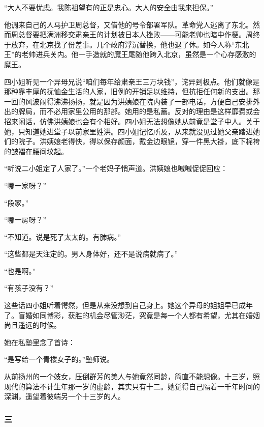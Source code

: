 \par “大人不要忧虑。我陈祖望有的正是忠心。大人的安全由我来担保。”
\par 他调来自己的人马护卫周总督，又借他的号令部署军队。革命党人逃离了东北。然而周总督要把满洲移交肃亲王的计划被日本人挫败——可能老帅也暗中作梗。周终于放弃，在北京找了份差事。几个政府浮沉替换，他也退了休。如今人称“东北王”的老帅进兵关内。他一手造就的魔王尾随他跨入北京，虽然是一个心存感激的魔王。
\par 四小姐听见一个异母兄说“咱们每年给肃亲王三万块钱”，诧异到极点。他们就像是那种靠丰厚的抚恤金生活的人家，旧例的开销足以维持，但抗拒任何新的支出。那一回的风波闹得沸沸扬扬，就是因为洪姨娘在院内装了一部电话，方便自己安排外出的牌局，而不必用家里公用的那部。她用的是私蓄。反对的理由是这样靡费或会招来闲话，仿佛洪姨娘也会有个相好。四小姐无法想像她从前竟是堂子中人。关于她，只知道她进堂子以前家里姓洪。四小姐记忆所及，从来就没见过她父亲踏进她们的院子。洪姨娘老得快，得以保存颜面，戴金边眼镜，穿一件黑大褂，底下棉袴的皱褶在腰间坟起。
\par “听说二小姐定了人家了。”一个老妈子悄声道。洪姨娘也嘁嘁促促回应：
\par “哪一家呀？”
\par “段家。”
\par “哪一房呀？”
\par “不知道。说是死了太太的。有肺病。”
\par “这些都是天注定的。男人身体好，还不是说病就病了。”
\par “也是啊。”
\par “有孩子没有？”
\par 这些话四小姐听着愕然，但是从来没想到自己身上。她这个异母的姐姐早已成年了。盲婚如同博彩，获胜的机会尽管渺茫，究竟是每一个人都有希望，尤其在婚姻尚且遥远的时候。
\par 她在私塾里念了首诗：
\par “是写给一个青楼女子的。”塾师说。
\par 从前扬州的一个妓女，压倒群芳的美人与她竟然同龄，简直不能想像。十三岁，照现代的算法不计生年那一岁的虚龄，其实只有十二。她觉得自己隔着一千年时间的深渊，遥望着彼端另一个十三岁的人。



\subsubsection*{三}


